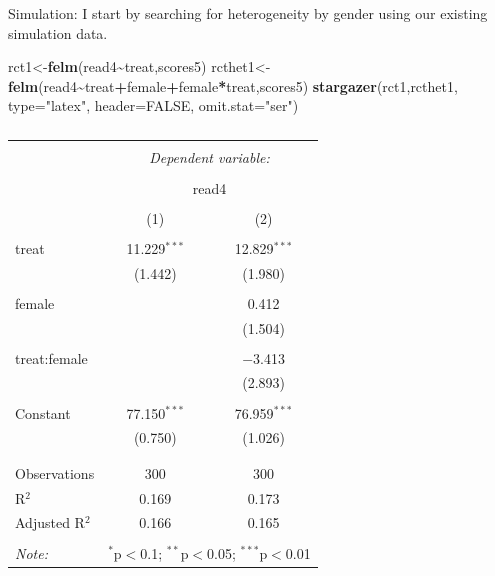 \documentclass[
  ignorenonframetext,
]{beamer}
\newenvironment{Shaded}{\begin{snugshade}}{\end{snugshade}}
\newcommand{\DataTypeTok}[1]{\textcolor[rgb]{0.13,0.29,0.53}{#1}}
\newcommand{\KeywordTok}[1]{\textcolor[rgb]{0.13,0.29,0.53}{\textbf{#1}}}
\newcommand{\NormalTok}[1]{#1}
\newcommand{\OperatorTok}[1]{\textcolor[rgb]{0.81,0.36,0.00}{\textbf{#1}}}
\newcommand{\OtherTok}[1]{\textcolor[rgb]{0.56,0.35,0.01}{#1}}
\newcommand{\StringTok}[1]{\textcolor[rgb]{0.31,0.60,0.02}{#1}}
\begin{document}
\begin{frame}[fragile]{Simulation:}
\protect\hypertarget{simulation}{}
I start by searching for heterogeneity by gender using our existing
simulation data.

\tiny

\begin{Shaded}
\begin{Highlighting}[]
\NormalTok{rct1\textless{}{-}}\KeywordTok{felm}\NormalTok{(read4}\OperatorTok{\textasciitilde{}}\NormalTok{treat,scores5)}
\NormalTok{rcthet1\textless{}{-}}\KeywordTok{felm}\NormalTok{(read4}\OperatorTok{\textasciitilde{}}\NormalTok{treat}\OperatorTok{+}\NormalTok{female}\OperatorTok{+}\NormalTok{female}\OperatorTok{*}\NormalTok{treat,scores5)}
\KeywordTok{stargazer}\NormalTok{(rct1,rcthet1, }\DataTypeTok{type=}\StringTok{"latex"}\NormalTok{, }\DataTypeTok{header=}\OtherTok{FALSE}\NormalTok{,  }\DataTypeTok{omit.stat=}\StringTok{"ser"}\NormalTok{)}
\end{Highlighting}
\end{Shaded}

\begin{table}[!htbp] \centering 
  \caption{} 
  \label{} 
\begin{tabular}{@{\extracolsep{5pt}}lcc} 
\\[-1.8ex]\hline 
\hline \\[-1.8ex] 
 & \multicolumn{2}{c}{\textit{Dependent variable:}} \\ 
\cline{2-3} 
\\[-1.8ex] & \multicolumn{2}{c}{read4} \\ 
\\[-1.8ex] & (1) & (2)\\ 
\hline \\[-1.8ex] 
 treat & 11.229$^{***}$ & 12.829$^{***}$ \\ 
  & (1.442) & (1.980) \\ 
  & & \\ 
 female &  & 0.412 \\ 
  &  & (1.504) \\ 
  & & \\ 
 treat:female &  & $-$3.413 \\ 
  &  & (2.893) \\ 
  & & \\ 
 Constant & 77.150$^{***}$ & 76.959$^{***}$ \\ 
  & (0.750) & (1.026) \\ 
  & & \\ 
\hline \\[-1.8ex] 
Observations & 300 & 300 \\ 
R$^{2}$ & 0.169 & 0.173 \\ 
Adjusted R$^{2}$ & 0.166 & 0.165 \\ 
\hline 
\hline \\[-1.8ex] 
\textit{Note:}  & \multicolumn{2}{r}{$^{*}$p$<$0.1; $^{**}$p$<$0.05; $^{***}$p$<$0.01} \\ 
\end{tabular} 
\end{table}
\end{frame}
\end{document}
